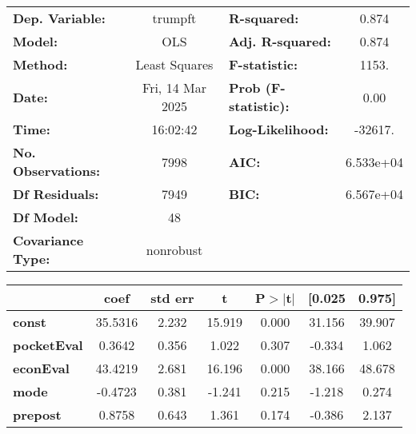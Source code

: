 \begin{center}
\begin{tabular}{lclc}
\toprule
\textbf{Dep. Variable:}         &     trumpft      & \textbf{  R-squared:         } &     0.874   \\
\textbf{Model:}                 &       OLS        & \textbf{  Adj. R-squared:    } &     0.874   \\
\textbf{Method:}                &  Least Squares   & \textbf{  F-statistic:       } &     1153.   \\
\textbf{Date:}                  & Fri, 14 Mar 2025 & \textbf{  Prob (F-statistic):} &     0.00    \\
\textbf{Time:}                  &     16:02:42     & \textbf{  Log-Likelihood:    } &   -32617.   \\
\textbf{No. Observations:}      &        7998      & \textbf{  AIC:               } & 6.533e+04   \\
\textbf{Df Residuals:}          &        7949      & \textbf{  BIC:               } & 6.567e+04   \\
\textbf{Df Model:}              &          48      & \textbf{                     } &             \\
\textbf{Covariance Type:}       &    nonrobust     & \textbf{                     } &             \\
\bottomrule
\end{tabular}
\begin{tabular}{lcccccc}
                                & \textbf{coef} & \textbf{std err} & \textbf{t} & \textbf{P$> |$t$|$} & \textbf{[0.025} & \textbf{0.975]}  \\
\midrule
\textbf{const}                  &      35.5316  &        2.232     &    15.919  &         0.000        &       31.156    &       39.907     \\
\textbf{pocketEval}             &       0.3642  &        0.356     &     1.022  &         0.307        &       -0.334    &        1.062     \\
\textbf{econEval}               &      43.4219  &        2.681     &    16.196  &         0.000        &       38.166    &       48.678     \\
\textbf{mode}                   &      -0.4723  &        0.381     &    -1.241  &         0.215        &       -1.218    &        0.274     \\
\textbf{prepost}                &       0.8758  &        0.643     &     1.361  &         0.174        &       -0.386    &        2.137     \\

\end{tabular}
\end{center}
